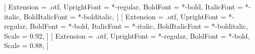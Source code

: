 %

\usepackage{fontspec}
\usepackage{polyglossia}
\setmainlanguage{vietnamese}

\setmainfont{texgyrepagella}[
  Extension      = .otf,
  UprightFont    = *-regular,
  BoldFont       = *-bold,
  ItalicFont     = *-italic,
  BoldItalicFont = *-bolditalic,
]
\setsansfont{texgyreheros}[
  Extension      = .otf,
  UprightFont    = *-regular,
  BoldFont       = *-bold,
  ItalicFont     = *-italic,
  BoldItalicFont = *-bolditalic,
  Scale          = 0.92,
]
\setmonofont{texgyrecursor}[
  Extension      = .otf,
  UprightFont    = *-regular,
  BoldFont       = *-bold,
  Scale          = 0.88,
]

\usepackage{amsmath}
\usepackage{amssymb}
\usepackage{amsthm}
\usepackage{mathtools}
\usepackage{unicode-math}

\usepackage{graphicx}
\usepackage{booktabs}
\usepackage{siunitx}
\usepackage{xcolor}


\graphicspath{{figures/}{../results/figures/slides/}{../results/figures/}}


\newcommand{\R}{\mathbb{R}}
\newcommand{\E}{\mathbb{E}}
\newcommand{\wstar}{w^{*}}
\newcommand{\fstar}{f^{*}}
\newcommand{\bigO}{\mathcal{O}}
\newcommand{\Batch}{\mathcal{B}}
\newcommand{\trans}{^{\top}}
\DeclareMathOperator*{\argmin}{arg\,min}
\DeclareMathOperator{\sign}{sign}
\DeclarePairedDelimiter{\norm}{\lVert}{\rVert}
\DeclarePairedDelimiter{\abs}{\lvert}{\rvert}

